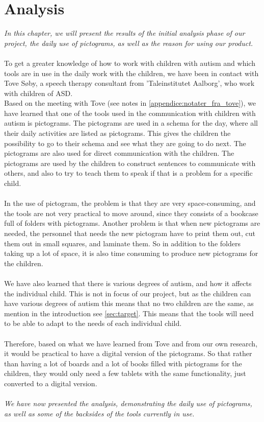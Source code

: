 \chapter{Analysis}

\textit{In this chapter, we will present the results of the initial analysis phase of our project, the daily use of pictograms, as well as the reason for using our product.}\\
\\
To get a greater knowledge of how to work with children with autism and which tools are in use in the daily work with the children, we have been in contact with  Tove S\o{}by, a speech therapy consultant from 'Taleinstitutet Aalborg', who work with children of ASD.\\ 

Based on the meeting with Tove (see notes in \autoref{appendice:notater_fra_tove}), we have learned that one of the tools used in the communication with children with autism is pictograms.
The pictograms are used in a schema for the day, where all their daily activities are listed as pictograms.
This gives the children the possibility to go to their schema and see what they are going to do next. 
The pictograms are also used for direct communication with the children. The pictograms are used by the children to construct sentences to communicate with others, and also to try to teach them to speak if that is a problem for a specific child.\\
\\
In the use of pictogram, the problem is that they are very space-consuming, and the tools are not very practical to move around, since they consists of a bookcase full of folders with pictograms. 
Another problem is that when new pictograms are needed, the personnel that needs the new pictogram have to print them out, cut them out in small squares, and laminate them. 
So in addition to the folders taking up a lot of space, it is also time consuming to produce new pictograms for the children.\\ 
\\
We have also learned that there is various degrees of autism, and how it affects the individual child. 
This is not in focus of our project, but as the children can have various degrees of autism this means that no two children are the same, as mention in the introduction see \autoref{sec:target}. 
This means that the tools will need to be able to adapt to the needs of each individual child.\\
\\ 
Therefore, based on what we have learned from Tove and from our own research, it would be practical to have a digital version of the pictograms. So that rather than having a lot of boards and a lot of books filled with pictograms for the children, they would only need a few tablets with the same functionality, just converted to a digital version.\\
\\
\textit{We have now presented the analysis, demonstrating the daily use of pictograms, as well as some of the backsides of the tools currently in use. }